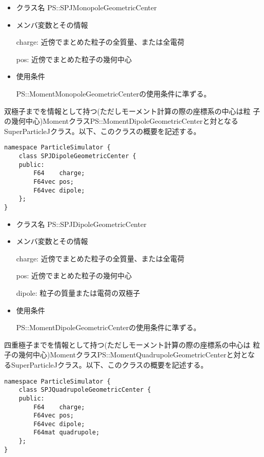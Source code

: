 \begin{itemize}
\item クラス名
  PS::SPJMonopoleGeometricCenter

\item メンバ変数とその情報

  charge: 近傍でまとめた粒子の全質量、または全電荷

  pos: 近傍でまとめた粒子の幾何中心

\item 使用条件

  PS::MomentMonopoleGeometricCenterの使用条件に準ずる。

\end{itemize}

\label{sec:SPJDipoleGeometricCenter}

双極子までを情報として持つ(ただしモーメント計算の際の座標系の中心は粒
子の幾何中心)MomentクラスPS::MomentDipoleGeometricCenterと対となる
SuperParticleJクラス。以下、このクラスの概要を記述する。
\begin{screen}
\begin{verbatim}
namespace ParticleSimulator {
    class SPJDipoleGeometricCenter {
    public:
        F64    charge;    
        F64vec pos;
        F64vec dipole;
    };
}
\end{verbatim}
\end{screen}

\begin{itemize}
\item クラス名
  PS::SPJDipoleGeometricCenter

\item メンバ変数とその情報

  charge: 近傍でまとめた粒子の全質量、または全電荷

  pos: 近傍でまとめた粒子の幾何中心

  dipole: 粒子の質量または電荷の双極子

\item 使用条件

  PS::MomentDipoleGeometricCenterの使用条件に準ずる。

\end{itemize}

\label{sec:SPJQuadrupoleGeometricCenter}

四重極子までを情報として持つ(ただしモーメント計算の際の座標系の中心は
粒子の幾何中心)MomentクラスPS::MomentQuadrupoleGeometricCenterと対とな
るSuperParticleJクラス。以下、このクラスの概要を記述する。
\begin{screen}
\begin{verbatim}
namespace ParticleSimulator {
    class SPJQuadrupoleGeometricCenter {
    public:
        F64    charge;    
        F64vec pos;
        F64vec dipole;
        F64mat quadrupole;
    };
}
\end{verbatim}
\end{screen}

